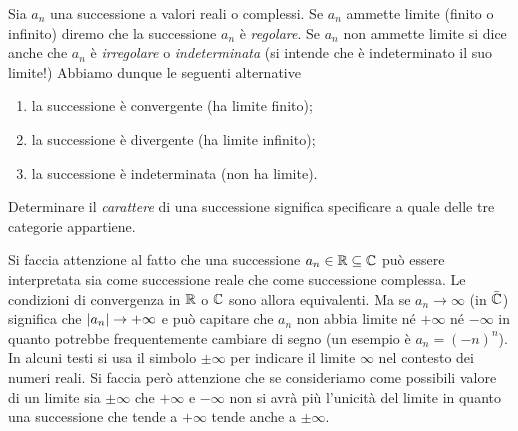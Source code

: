 \begin{definition}
\mymark{***}
Sia $a_n$ una successione a valori reali o complessi.
Se $a_n$ ammette limite (finito o infinito)
diremo che la successione $a_n$ è \emph{regolare}.
%
%
%
Se $a_n$ non ammette limite
si dice anche che $a_n$ è \emph{irregolare}
%
o \emph{indeterminata}
%
(si intende che è indeterminato il suo limite!)
Abbiamo dunque le seguenti alternative
\begin{enumerate}
 \item la successione è convergente (ha limite finito);
 \item la successione è divergente (ha limite infinito);
 \item la successione è indeterminata (non ha limite).
\end{enumerate}
Determinare il \emph{carattere}
%
%
di una successione
significa specificare a quale delle tre categorie appartiene.
\end{definition}

Si faccia attenzione al fatto che una successione $a_n\in \mathbb R \subseteq \mathbb C$
può essere interpretata sia come successione reale che come successione complessa.
Le condizioni di convergenza in $\mathbb R$ o $\mathbb C$ sono allora equivalenti. Ma
se $a_n \to \infty$ (in $\bar {\mathbb C}$) significa che ${\left|a_n\right|}\to +\infty$
e può capitare che $a_n$ non abbia limite né $+\infty$
né $-\infty$ in quanto potrebbe frequentemente cambiare di segno
(un esempio è $a_n = (-n)^n$).
In alcuni testi si usa il simbolo $\pm \infty$ per indicare
il limite $\infty$ nel contesto dei numeri reali. Si faccia però
attenzione che se consideriamo come possibili valore di un limite
sia $\pm\infty$ che $+\infty$ e $-\infty$ non si avrà più l'unicità
del limite in quanto una successione che tende a $+\infty$
tende anche a $\pm \infty$.

